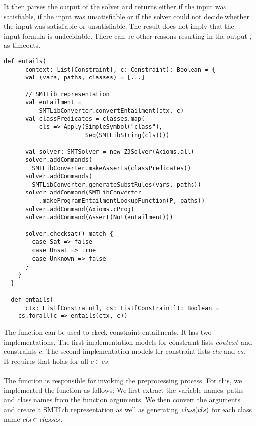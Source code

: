 It then parses the output of the solver
and returns either
 if the input was satisfiable,
 if the input was unsatisfiable or
 if the solver could not decide
whether the input was satisfiable or unsatisfiable.
The result  does not imply
that the input formula is undecidable.
There can be other reasons resulting
in the output , as timeouts.
%
\begin{lstlisting}[caption={Entailment Function},label=lst:entails,captionpos=b,frame={lines}]
  def entails(
      context: List[Constraint], c: Constraint): Boolean = {
      val (vars, paths, classes) = [...]

      // SMTLib representation
      val entailment =
          SMTLibConverter.convertEntailment(ctx, c)
      val classPredicates = classes.map(
          cls => Apply(SimpleSymbol("class"),
                       Seq(SMTLibString(cls))))

      val solver: SMTSolver = new Z3Solver(Axioms.all)
      solver.addCommands(
        SMTLibConverter.makeAsserts(classPredicates))
      solver.addCommands(
        SMTLibConverter.generateSubstRules(vars, paths))
      solver.addCommand(SMTLibConverter
          .makeProgramEntailmentLookupFunction(P, paths))
      solver.addCommand(Axioms.cProg)
      solver.addCommand(Assert(Not(entailment)))

      solver.checksat() match {
        case Sat => false
        case Unsat => true
        case Unknown => false
      }
    }
  }

  def entails(
      ctx: List[Constraint], cs: List[Constraint]): Boolean =
    cs.forall(c => entails(ctx, c))
\end{lstlisting}
%
The function  can be used
to check constraint entailments.
It has two implementations.
The first implementation models 
for constraint lists $context$ and constraints $c$.
The second implementation models 
for constraint lists $ctx$ and $cs$.
It requires that  holds for
all $c \in cs$.\\
\\
The function is responsible for
invoking the preprocessing process.
For this, we implemented the function as follows:
We first extract the variable names, paths
and class names from the function arguments.
We then convert the arguments and create
a SMTLib representation 
as well as generating $\mathit{class}(cls)$
for each class name $cls \in \mathit{classes}$.

